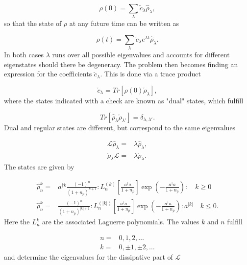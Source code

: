 \documentclass[12pt]{article}
\begin{document}
\begin{equation}
    \rho(0) = \sum_{\lambda} \check{c}_{\lambda} \hat{\rho}_{\lambda}, 
\end{equation} so that the state of $\rho$ at any future time can be written as

\begin{equation}
    \rho(t) = \sum_{\lambda} \check{c}_{\lambda} e^{\lambda t}\hat{\rho}_{\lambda}. 
\end{equation} In both cases $\lambda$ runs over all possible eigenvalues and accounts for different eigenstates should there be degeneracy. The problem then becomes finding an expression for the coefficients $\check{c}_{\lambda}$. This is done via a trace product

\begin{equation}
    \check{c}_\lambda = Tr[\rho(0)\check{\rho}_\lambda],
\end{equation} where the states indicated with a check are known as "dual" states, which fulfill

\begin{equation}
    Tr[\hat{\rho}_{\lambda} \check{\rho}_{\lambda'}] = \delta_{\lambda,\lambda'}. 
\end{equation} Dual and regular states are different, but correspond to the same eigenvalues

\begin{align}
    \mathcal{L}\hat{\rho}_\lambda =& \lambda \hat{\rho}_\lambda, \\
    \check{\rho}_\lambda\mathcal{L} =& \lambda \check{\rho}_\lambda.
\end{align} The states are given by

\begin{align}
  \hat{\rho}_n^k=& a^{\dagger k} \frac{(-1)^{n}}{(1+n_p)^{k+1}}: L_{n}^{(k)}\left[\frac{a^{\dagger} a}{1+n_p}\right] \exp (-\frac{a^{\dagger} a}{1+n_p}):  \quad k \geq 0 \nonumber\\
    \hat{\rho}_n^k=& \frac{(-1)^{n}}{(1+n_p)^{|k|+1}}: L_{n}^{(|k|)}\left[\frac{a^{\dagger} a}{1+n_p}\right] \exp (-\frac{a^{\dagger} a}{1+n_p}): a^{|k|}  \quad k \leq 0 . \nonumber
\end{align} Here the $L_n^k$ are the associated Laguerre polynomials. The values $k$ and $n$ fulfill

\begin{align}
    n=&0,1,2,\dots \\
    k=&0,\pm 1,\pm 2, \dots
\end{align} and determine the eigenvalues for the dissipative part of $\mathcal{L}$
\end{document}
